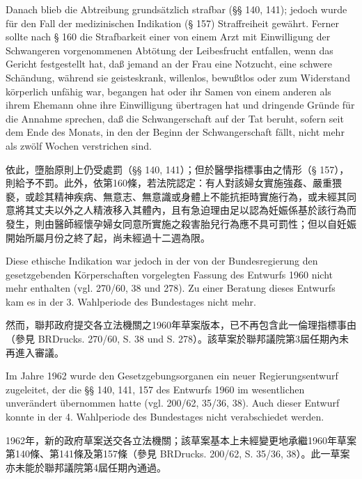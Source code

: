 \documentclass[12pt]{article}
\begin{document}
\syncleft
\begin{sourcepara}
Danach blieb die Abtreibung grundsätzlich strafbar (§§ 140, 141); jedoch wurde für den Fall der medizinischen Indikation (§ 157) Straffreiheit gewährt. Ferner sollte nach § 160 die Strafbarkeit einer von einem Arzt mit Einwilligung der Schwangeren vorgenommenen Abtötung der Leibesfrucht entfallen, wenn das Gericht festgestellt hat, daß jemand an der Frau eine Notzucht, eine schwere Schändung, während sie geisteskrank, willenlos, bewußtlos oder zum Widerstand körperlich unfähig war, begangen hat oder ihr Samen von einem anderen als ihrem Ehemann ohne ihre Einwilligung übertragen hat und dringende Gründe für die Annahme sprechen, daß die Schwangerschaft auf der Tat beruht, sofern seit dem Ende des Monats, in den der Beginn der Schwangerschaft fällt, nicht mehr als zwölf Wochen verstrichen sind.
\end{sourcepara}
\begin{transpara}
依此，墮胎原則上仍受處罰（§§ 140, 141）；但於醫學指標事由之情形（§ 157），則給予不罰。此外，依第160條，若法院認定：有人對該婦女實施強姦、嚴重猥褻，或趁其精神疾病、無意志、無意識或身體上不能抗拒時實施行為，或未經其同意將其丈夫以外之人精液移入其體內，且有急迫理由足以認為妊娠係基於該行為而發生，則由醫師經懷孕婦女同意所實施之殺害胎兒行為應不具可罰性；但以自妊娠開始所屬月份之終了起，尚未經過十二週為限。
\end{transpara}

\syncleft
\begin{sourcepara}
Diese ethische Indikation war jedoch in der von der Bundesregierung den gesetzgebenden Körperschaften vorgelegten Fassung des Entwurfs 1960 nicht mehr enthalten (vgl. \abbrBRDrucks{} 270/60, \abbrS{} 38 und \abbrS{} 278). Zu einer Beratung dieses Entwurfs kam es in der 3. Wahlperiode des Bundestages nicht mehr.
\end{sourcepara}
\begin{transpara}
然而，聯邦政府提交各立法機關之1960年草案版本，已不再包含此一倫理指標事由（參見 BRDrucks. 270/60, S. 38 und S. 278）。該草案於聯邦議院第3屆任期內未再進入審議。
\end{transpara}

\syncleft
\begin{sourcepara}
Im Jahre 1962 wurde den Gesetzgebungsorganen ein neuer Regierungsentwurf zugeleitet, der die §§ 140, 141, 157 des Entwurfs 1960 im wesentlichen unverändert übernommen hatte (vgl. \abbrBRDrucks{} 200/62, \abbrS{} 35/36, 38). Auch dieser Entwurf konnte in der 4. Wahlperiode des Bundestages nicht verabschiedet werden.
\end{sourcepara}
\begin{transpara}
1962年，新的政府草案送交各立法機關；該草案基本上未經變更地承繼1960年草案第140條、第141條及第157條（參見 BRDrucks. 200/62, S. 35/36, 38）。此一草案亦未能於聯邦議院第4屆任期內通過。
\end{transpara}
\end{document}
